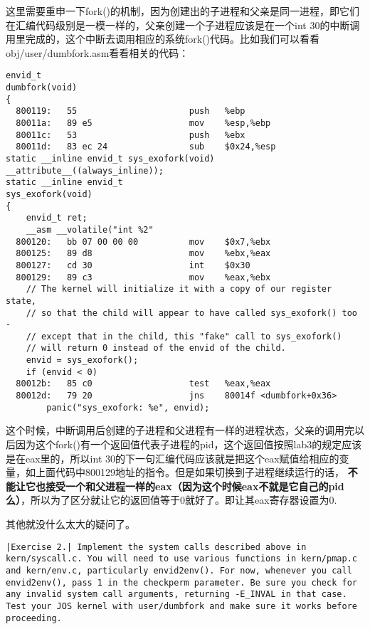 \documentclass{article}
\newcommand{\highlight}[1]{{\bfseries \color{red}  #1}}
\newcommand{\funcname}[1]{{\ttfamily \small #1}}
\begin{document}
\begin{CJK*}{UTF8}{gkai}
这里需要重申一下\funcname{fork()}的机制，因为创建出的子进程和父亲是同一进程，即它们在汇编代码级别是一模一样的，父亲创建一个子进程应该是在一个int 30的中断调用里完成的，这个中断去调用相应的系统\funcname{fork()}代码。比如我们可以看看obj/user/dumbfork.asm看看相关的代码：

\begin{lstlisting}[style=acode, firstnumber=118, title={\scriptsize \ttfamily \bfseries obj/user/dumbfork.asm}]
envid_t
dumbfork(void)
{
  800119:	55                   	push   %ebp
  80011a:	89 e5                	mov    %esp,%ebp
  80011c:	53                   	push   %ebx
  80011d:	83 ec 24             	sub    $0x24,%esp
static __inline envid_t sys_exofork(void) __attribute__((always_inline));
static __inline envid_t
sys_exofork(void)
{
	envid_t ret;
	__asm __volatile("int %2"
  800120:	bb 07 00 00 00       	mov    $0x7,%ebx
  800125:	89 d8                	mov    %ebx,%eax
  800127:	cd 30                	int    $0x30
  800129:	89 c3                	mov    %eax,%ebx
	// The kernel will initialize it with a copy of our register state,
	// so that the child will appear to have called sys_exofork() too -
	// except that in the child, this "fake" call to sys_exofork()
	// will return 0 instead of the envid of the child.
	envid = sys_exofork();
	if (envid < 0)
  80012b:	85 c0                	test   %eax,%eax
  80012d:	79 20                	jns    80014f <dumbfork+0x36>
		panic("sys_exofork: %e", envid);
\end{lstlisting}

这个时候，中断调用后创建的子进程和父进程有一样的进程状态，父亲的调用完以后因为这个\funcname{fork()}有一个返回值代表子进程的pid，这个返回值按照lab3的规定应该是在eax里的，所以int 30的下一句汇编代码应该就是把这个eax赋值给相应的变量，如上面代码中800129地址的指令。但是如果切换到子进程继续运行的话，\highlight{不能让它也接受一个和父进程一样的eax（因为这个时候eax不就是它自己的pid么）}，所以为了区分就让它的返回值等于0就好了。即让其eax寄存器设置为0.

其他就没什么太大的疑问了。

\vspace{2em}

\begin{lstlisting}[style=exercise]
|Exercise 2.| Implement the system calls described above in kern/syscall.c. You will need to use various functions in kern/pmap.c and kern/env.c, particularly envid2env(). For now, whenever you call envid2env(), pass 1 in the checkperm parameter. Be sure you check for any invalid system call arguments, returning -E_INVAL in that case. Test your JOS kernel with user/dumbfork and make sure it works before proceeding.
\end{lstlisting}


\end{CJK*}
\end{document}
